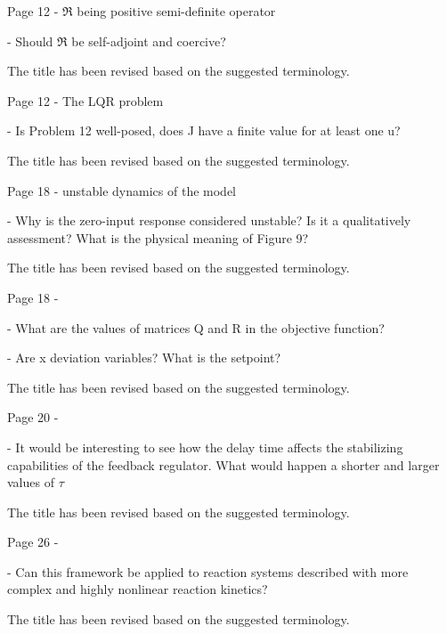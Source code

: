 \documentclass[10pt,answers]{exam}
\begin{document}
\begin{questions}
    \question Page 12 - $\mathfrak{R}$ being positive semi-definite operator

    - Should $\mathfrak{R}$ be self-adjoint and coercive?

    \begin{solutionorbox}
        The title has been revised based on the suggested terminology.
    \end{solutionorbox}


    \question Page 12 - The LQR problem

    - Is Problem 12 well-posed, does J have a finite value for at least one u?

    \begin{solutionorbox}
        The title has been revised based on the suggested terminology.
    \end{solutionorbox}


    \question Page 18 - unstable dynamics of the model

    - Why is the zero-input response considered unstable? Is it a qualitatively assessment? What is the physical meaning of Figure 9?

    \begin{solutionorbox}
        The title has been revised based on the suggested terminology.
    \end{solutionorbox}


    \question Page 18 - 

    - What are the values of matrices Q and R in the objective function?

    - Are x deviation variables? What is the setpoint?

    \begin{solutionorbox}
        The title has been revised based on the suggested terminology.
    \end{solutionorbox}


    \question Page 20 - 

    - It would be interesting to see how the delay time affects the stabilizing capabilities of the feedback regulator. What would happen a shorter and larger values of $\tau$

    \begin{solutionorbox}
        The title has been revised based on the suggested terminology.
    \end{solutionorbox}


    \question Page 26 - 

    - Can this framework be applied to reaction systems described with more complex and highly nonlinear reaction kinetics?

    \begin{solutionorbox}
        The title has been revised based on the suggested terminology.
    \end{solutionorbox}


\end{questions}
\end{document}
